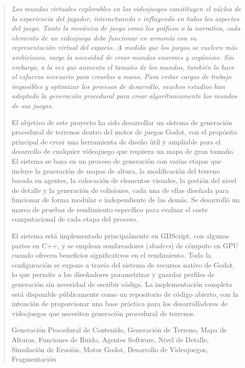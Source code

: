 \documentclass[english,a4paper,12pt,oneside]{extreport}
\newenvironment{palabrasClave}
{\begin{list}{}{\setlength{\leftmargin}{1em}}\item[\hskip\labelsep \bfseries Palabras clave:]}
{\end{list}}
\begin{document}
\newpage  %
{}
\begin{abstract}
{\em
Los mundos virtuales explorables en los videojuegos constituyen el núcleo de la experiencia del jugador, interactuando e influyendo en todos los aspectos del juego. 
Tanto la mecánica de juego como los gráficos o la narrativa, cada elemento de un videojuego debe funcionar en armonía con su representación virtual del espacio. 
A medida que los juegos se vuelven más ambiciosos, surge la necesidad de crear mundos enormes y orgánicos.
Sin embargo, a la vez que aumenta el tamaño de los mundos, también lo hace el esfuerzo necesario para crearlos a mano.
Para evitar cargas de trabajo imposibles y optimizar los procesos de desarrollo, muchos estudios han adoptado la generación procedural para crear algorítmicamente los mundos de sus juegos.

El objetivo de este proyecto ha sido desarrollar un sistema de generación procedural de terrenos dentro del motor de juegos Godot, con el propósito principal de crear una herramienta de diseño útil y ampliable para el desarrollo de cualquier videojuego que requiera un mapa de gran tamaño.
El sistema se basa en un proceso de generación con varias etapas que incluye la generación de mapas de altura, la modificación del terreno basada en agentes, la colocación de elementos visuales, la gestión del nivel de detalle y la generación de colisiones, cada una de ellas diseñada para funcionar de forma modular e independiente de las demás.
Se desarrolló un marco de pruebas de rendimiento específico para evaluar el coste computacional de cada etapa del proceso.

El sistema está implementado principalmente en GDScript, con algunas partes en C++, y se emplean sombreadores (\textit{shaders}) de cómputo en GPU cuando ofrecen beneficios significativos en el rendimiento.
Toda la configuración se expone a través del sistema de recursos nativo de Godot, lo que permite a los diseñadores parametrizar y guardar perfiles de generación sin necesidad de escribir código.
La implementación completa está disponible públicamente como un repositorio de código abierto, con la intención de proporcionar una base práctica para los desarrolladores de videojuegos que necesiten generación procedural de terrenos.
}

\begin{palabrasClave}
Generación Procedural de Contenido, Generación de Terreno, Mapa de Alturas, Funciones de Ruido, Agentes Software, Nivel de Detalle, Simulación de Erosión, Motor Godot, Desarrollo de Videojuegos, Fragmentación
\end{palabrasClave}
\end{abstract}
\end{document}
